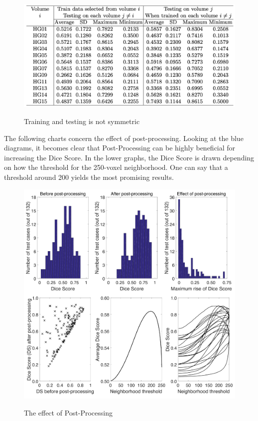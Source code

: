 \documentclass[
12pt,
headsepline,
bibliography=totoc,
twoside=semi,
fleqn
]{scrartcl}
\begin{document}
 \begin{figure}[H]
 \centering \includegraphics[scale=0.7]{BDT17.png}\label{fig:fig17}
 \caption{Training and testing is not symmetric}
 \end{figure} 

 The following charts concern the effect of post-processing. Looking at the blue diagrams, it becomes clear that Post-Processing can be highly beneficial for increasing the Dice Score. In the lower graphs, the Dice Score is drawn depending on how the threshold for the 250-voxel neighborhood. One can say that a threshold around 200 yields the most promising results. 

 \begin{figure}[H]
 \centering \includegraphics[scale=0.4]{BDT18.png}\label{fig:fig18}
 \caption{The effect of Post-Processing}
 \end{figure} 
\end{document}
